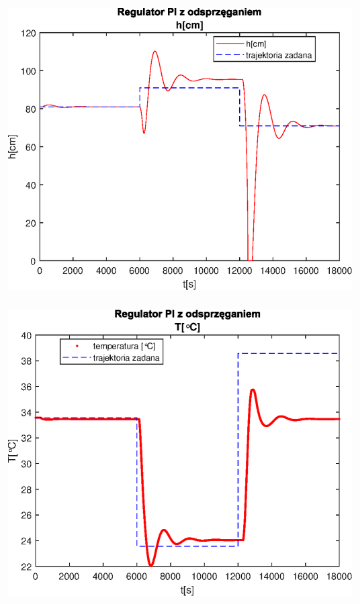 \begin{figure}[h!]
   \centering
   \begin{subfigure}[b]{0.4\textwidth}
      \includegraphics[width=1\linewidth]{img/PI/decoupler/noDisturbance/PIDecouplerH1Lintrue.eps}
      \caption{}
      \label{fig:fig:PIDecoupler1Lintrue1}
   \end{subfigure}
       
   \begin{subfigure}[b]{0.4\textwidth}
      \includegraphics[width=1\linewidth]{img/PI/decoupler/noDisturbance/PIDecouplerT1Lintrue.eps}
      \caption{}
      \label{fig:fig:PIDecoupler1Lintrue2}
   \end{subfigure}
       

\end{figure}
